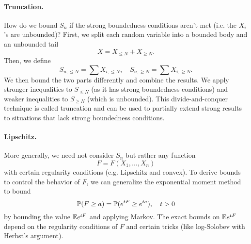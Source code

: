 \paragraph{Truncation.} How do we bound $S_n$ if the strong boundedness conditions aren't met (i.e. the $X_i$'s are unbounded)? First, we split each random variable into a bounded body and an unbounded tail
\[
    X = X_{\leq N} + X_{\geq N}.
\]
Then, we define
\[
    S_{n, \leq N} = \sum X_{i, \leq N}, \quad S_{n, \geq N} = \sum X_{i, \geq N}.
\]
We then bound the two parts differently and combine the results. We apply stronger inequalities to $S_{\leq N}$ (as it has strong boundedness conditions) and weaker inequalities to $S_{\geq N}$ (which is unbounded). This divide-and-conquer technique is called truncation and can be used to partially extend strong results to situations that lack strong boundedness conditions.

\paragraph{Lipschitz.} More generally, we need not consider $S_n$ but rather any function
\[
    F = F(X_1, \dots, X_n)
\]
with certain regularity conditions (e.g. Lipschitz and convex). To derive bounds to control the behavior of $F$, we can generalize the exponential moment method to bound
\[
    {\mathbb P}(F \geq a) = {\mathbb P}(e^{tF} \geq e^{ta}), \quad t > 0
\]
by bounding the value ${\mathbb E} e^{tF}$ and applying Markov. The exact bounds on ${\mathbb E} e^{tF}$ depend on the regularity conditions of $F$ and certain tricks (like log-Solobev with Herbst's argument).

